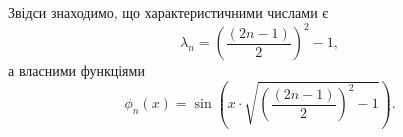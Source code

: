 \begin{solution}
\begin{enumerate}
        Звідси знаходимо, що характеристичними числами є 
        \[\lambda_n = \left(\dfrac{(2 n - 1)}{2}\right)^2 - 1, \]
        а власними функціями
        \[\phi_n(x) = \sin \left(x\cdot\sqrt{\left(\dfrac{(2n - 1)}{2}\right)^2 - 1}\right).\]
    \end{enumerate}
\end{solution}
